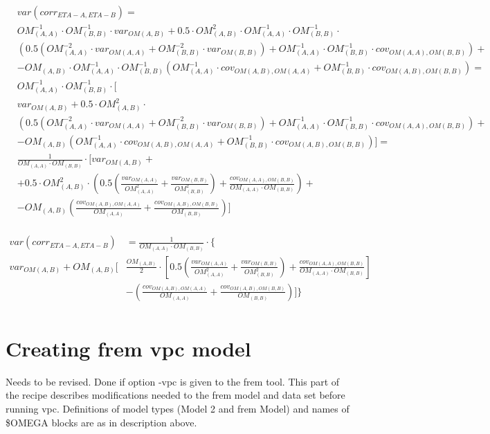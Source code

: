 \[
\begin{split}
&var\left(corr_{ETA-A,ETA-B}\right)=\\
& OM_{(A,A)}^{-1} \cdot OM_{(B,B)}^{-1}\cdot var_{OM(A,B)}+0.5 \cdot OM_{(A,B)}^2\cdot OM_{(A,A)}^{-1} \cdot OM_{(B,B)}^{-1}\cdot \\
&\left(0.5 \left ( OM_{(A,A)}^{-2}\cdot var_{OM(A,A)}+OM_{(B,B)}^{-2}\cdot var_{OM(B,B)}    \right) +  OM_{(A,A)}^{-1} \cdot OM_{(B,B)}^{-1}\cdot cov_{OM(A,A),OM(B,B)} \right)+\\
& - OM_{(A,B)} \cdot OM_{(A,A)}^{-1} \cdot OM_{(B,B)}^{-1}\left(OM_{(A,A)}^{-1} \cdot cov_{OM(A,B),OM(A,A)}+OM_{(B,B)}^{-1}\cdot cov_{OM(A,B),OM(B,B)} \right) =\\
& OM_{(A,A)}^{-1} \cdot OM_{(B,B)}^{-1}\cdot [ \\
& var_{OM(A,B)}+0.5 \cdot OM_{(A,B)}^2\cdot \\
&\left(0.5 \left ( OM_{(A,A)}^{-2}\cdot var_{OM(A,A)}+OM_{(B,B)}^{-2}\cdot var_{OM(B,B)}    \right) +  OM_{(A,A)}^{-1} \cdot OM_{(B,B)}^{-1}\cdot cov_{OM(A,A),OM(B,B)} \right)+\\
& - OM_{(A,B)} \left(OM_{(A,A)}^{-1} \cdot cov_{OM(A,B),OM(A,A)}+OM_{(B,B)}^{-1}\cdot cov_{OM(A,B),OM(B,B)} \right) ]=\\
& \frac{1}{OM_{(A,A)}\cdot OM_{(B,B)}}\cdot [ var_{OM(A,B)} +\\
& +0.5 \cdot OM_{(A,B)}^2\cdot
\left(0.5 \left ( \frac{var_{OM(A,A)}}{OM_{(A,A)}^{2}}  +\frac{var_{OM(B,B)}}{OM_{(B,B)}^{2}}    \right) +  \frac{cov_{OM(A,A),OM(B,B)}}{OM_{(A,A)} \cdot OM_{(B,B)}} \right)+\\
& - OM_{(A,B)} \left(\frac{cov_{OM(A,B),OM(A,A)}}{OM_{(A,A)}}+ \frac{cov_{OM(A,B),OM(B,B)}}{OM_{(B,B)}} \right) ]\\
\end{split}
\]

\[
\begin{split}
var\left(corr_{ETA-A,ETA-B}\right)&=\frac{1}{OM_{(A,A)}\cdot OM_{(B,B)}}\cdot \{\\
 var_{OM(A,B)} + OM_{(A,B)} [ & \frac{OM_{(A,B)}}{2}\cdot
\left[0.5 \left ( \frac{var_{OM(A,A)}}{OM_{(A,A)}^{2}}  +\frac{var_{OM(B,B)}}{OM_{(B,B)}^{2}}    \right) +  \frac{cov_{OM(A,A),OM(B,B)}}{OM_{(A,A)} \cdot OM_{(B,B)}} \right]\\
& - \left(\frac{cov_{OM(A,B),OM(A,A)}}{OM_{(A,A)}}+ \frac{cov_{OM(A,B),OM(B,B)}}{OM_{(B,B)}} \right)]\}\\
\end{split}
\]


\section{Creating frem vpc model}
Needs to be revised.
Done if option -vpc is given to the frem tool. This part of the recipe describes modifications needed to the frem model and data set before running vpc. Definitions of model types (Model 2 and frem Model) and names of \$OMEGA blocks are as in description above.


